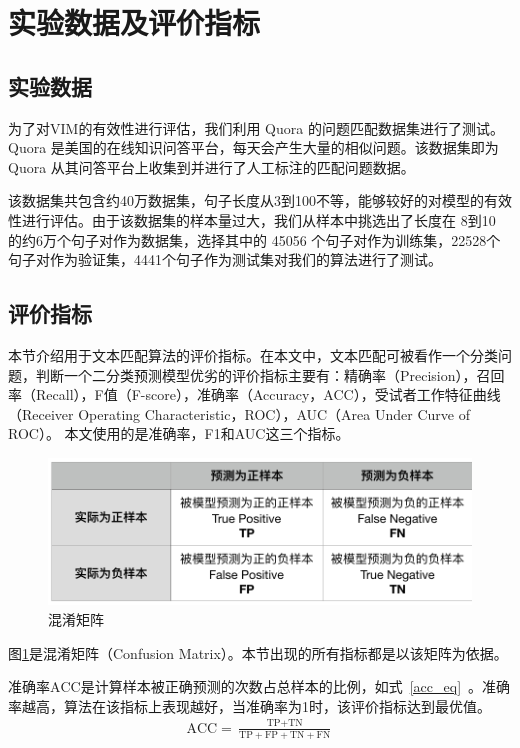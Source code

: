 \section{实验数据及评价指标}
\subsection{实验数据}
为了对VIM的有效性进行评估，我们利用 Quora 的问题匹配数据集进行了测试。 Quora 是美国的在线知识问答平台，每天会产生大量的相似问题。该数据集即为 Quora 从其问答平台上收集到并进行了人工标注的匹配问题数据。

该数据集共包含约40万数据集，句子长度从3到100不等，能够较好的对模型的有效性进行评估。由于该数据集的样本量过大，我们从样本中挑选出了长度在 8到10 的约6万个句子对作为数据集，选择其中的 45056 个句子对作为训练集，22528个句子对作为验证集，4441个句子作为测试集对我们的算法进行了测试。

\subsection{评价指标}
本节介绍用于文本匹配算法的评价指标。在本文中，文本匹配可被看作一个分类问题，判断一个二分类预测模型优劣的评价指标主要有：精确率（Precision），召回率（Recall），F值（F-score），准确率（Accuracy，ACC），受试者工作特征曲线（Receiver Operating Characteristic，ROC），AUC（Area Under Curve of ROC）。
本文使用的是准确率，F1和AUC这三个指标。

\begin{figure}[!htbp]
\vspace{1em}
\centering
  \includegraphics[width=0.9\linewidth]{figures/matrix}
  \caption{混淆矩阵}
  \label{fig:Con_matrix}       %
\vspace{1em}
\end{figure}

图\ref{fig:Con_matrix}是混淆矩阵（Confusion Matrix）。本节出现的所有指标都是以该矩阵为依据。

准确率$\text{ACC}$是计算样本被正确预测的次数占总样本的比例，如式~\eqref{acc_eq}~。准确率越高，算法在该指标上表现越好，当准确率为1时，该评价指标达到最优值。
\begin{equation}
\label{acc_eq}
\begin{aligned}
\text{ACC}=\frac{\text{TP}+\text{TN}}{\text{TP}+\text{FP}+\text{TN}+\text{FN}}
\end{aligned}
\end{equation}

